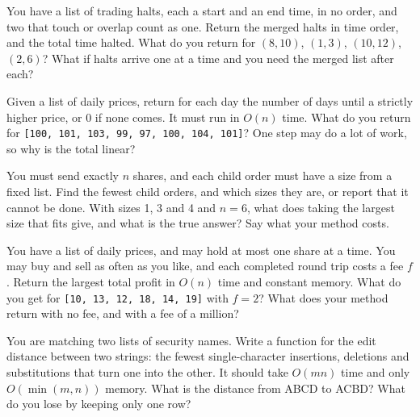 \begin{question}\label{iq:iv3:algorithms:26}
You have a list of trading halts, each a start and an end time, in no order, and two that touch or overlap count as one. Return the merged halts in time order, and the total time halted. What do you return for $(8, 10)$, $(1, 3)$, $(10, 12)$, $(2, 6)$? What if halts arrive one at a time and you need the merged list after each?
\end{question}

\begin{question}\label{iq:iv3:algorithms:27}
Given a list of daily prices, return for each day the number of days until a strictly higher price, or 0 if none comes. It must run in $O(n)$ time. What do you return for \texttt{[100, 101, 103, 99, 97, 100, 104, 101]}? One step may do a lot of work, so why is the total linear?
\end{question}

\begin{question}\label{iq:iv3:algorithms:28}
You must send exactly $n$ shares, and each child order must have a size from a fixed list. Find the fewest child orders, and which sizes they are, or report that it cannot be done. With sizes 1, 3 and 4 and $n = 6$, what does taking the largest size that fits give, and what is the true answer? Say what your method costs.
\end{question}

\begin{question}\label{iq:iv3:algorithms:29}
You have a list of daily prices, and may hold at most one share at a time. You may buy and sell as often as you like, and each completed round trip costs a fee $f$. Return the largest total profit in $O(n)$ time and constant memory. What do you get for \texttt{[10, 13, 12, 18, 14, 19]} with $f = 2$? What does your method return with no fee, and with a fee of a million?
\end{question}

\begin{question}\label{iq:iv3:algorithms:30}
You are matching two lists of security names. Write a function for the edit distance between two strings: the fewest single-character insertions, deletions and substitutions that turn one into the other. It should take $O(mn)$ time and only $O(\min(m, n))$ memory. What is the distance from ABCD to ACBD? What do you lose by keeping only one row?
\end{question}

